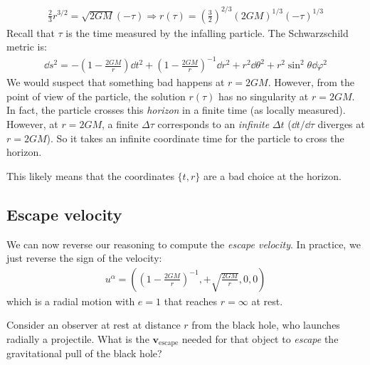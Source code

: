 \documentclass[../template.tex]{subfiles}
\begin{document}
\begin{align*}
    \frac{2}{3}r^{3/2} = \sqrt{2GM} (- \tau) \Rightarrow r(\tau) = \left(\frac{3}{2} \right)^{2/3} (2GM)^{1/3} (-\tau)^{1/3}
\end{align*}   
Recall that $\tau$ is the time measured by the infalling particle. The Schwarzschild metric is:
\begin{align*}
    \dd{s}^2 = -\left(1-\frac{2GM}{r} \right)\dd{t}^2 + \left(1-\frac{2GM}{r} \right)^{-1} \dd{r}^2 + r^2 \dd{\theta}^2 + r^2 \sin^2 \theta \dd{\varphi}^2
\end{align*} 
We would suspect that something bad happens at $r=2GM$. However, from the point of view of the particle, the solution $r(\tau)$ has no singularity at $r = 2GM$. In fact, the particle crosses this \textit{horizon} in a finite time (as locally measured). However, at $r=2GM$, a finite $\Delta \tau$ corresponds to an \textit{infinite} $\Delta t$ ($\dd{t}/\dd{\tau}$ diverges at $r=2GM$). So it takes an infinite coordinate time for the particle to cross the horizon. 

This likely means that the coordinates $\{t,r\}$ are a bad choice at the horizon. 

\subsection{Escape velocity}
We can now reverse our reasoning to compute the \textit{escape velocity}. In practice, we just reverse the sign of the velocity:
\begin{align*}
    u^\alpha = \left(\left(1- \frac{2GM}{r} \right)^{-1}, + \sqrt{\frac{2GM}{r} },0,0\right)
\end{align*}
which is a radial motion with $e=1$ that reaches $r=\infty$ at rest. 

Consider an observer at rest at distance $r$ from the black hole, who launches radially a projectile. What is the $\bm{v}_{\mathrm{escape}}$ needed for that object to \textit{escape} the gravitational pull of the black hole?  
\end{document}
